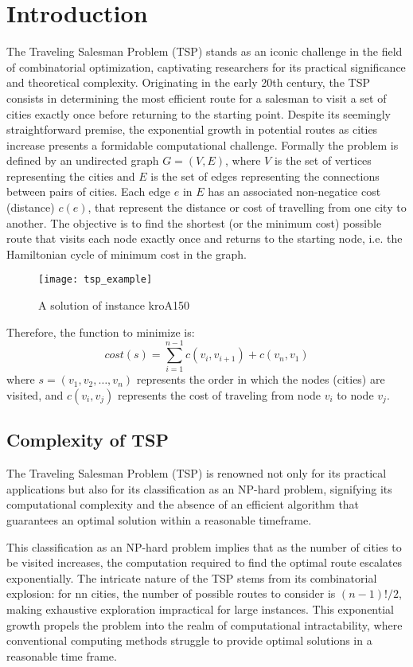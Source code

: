 \chapter{Introduction}

The Traveling Salesman Problem (TSP) stands as an iconic challenge in the field of combinatorial optimization,
captivating researchers for its practical significance and theoretical complexity. Originating in the early 20th century,
the TSP consists in determining the most efficient route for a salesman to visit a set of cities exactly once before returning 
to the starting point. Despite its seemingly straightforward premise, the exponential growth in potential routes as cities 
increase presents a formidable computational challenge.\newline
Formally the problem is defined by an undirected graph $G = (V,E)$, where $V$ is the set of vertices representing the cities and
$E$ is the set of edges representing the connections between pairs of cities. Each edge $e$ in $E$ 
has an associated non-negatice cost (distance) $c(e)$, that represent the distance or cost of travelling from one
city to another. The objective is to find the shortest (or the minimum cost) possible route that visits each node exactly
once and returns to the starting node, i.e. the Hamiltonian cycle of minimum cost in the graph.
\begin{figure}[H]
	\centering
	\texttt{[image: tsp\_example]}
	\caption{A solution of instance kroA150}
\end{figure}
Therefore, the function to minimize is:
\[
    cost(s) = \sum_{i=1}^{n-1} c(v_i, v_{i+1}) + c(v_n,v_1)
\]
where $s = (v_1,v_2,\ldots,v_n)$ represents the order in which the nodes (cities) are visited, and $c(v_i,v_j)$ 
represents the cost of traveling from node $v_i$ to node $v_j$.
\section{Complexity of TSP}

The Traveling Salesman Problem (TSP) is renowned not only for its practical applications but also for its classification as an NP-hard problem, signifying its computational complexity and the absence of an efficient algorithm that guarantees an optimal solution within a reasonable timeframe.

This classification as an NP-hard problem implies that as the number of cities to be visited increases, the computation required to find the optimal route escalates exponentially.
The intricate nature of the TSP stems from its combinatorial explosion: for nn cities, the number of possible routes to consider is $(n-1)!/2$, making exhaustive exploration impractical for large instances.
This exponential growth propels the problem into the realm of computational intractability, where conventional computing methods struggle to provide optimal solutions in a reasonable time frame.

